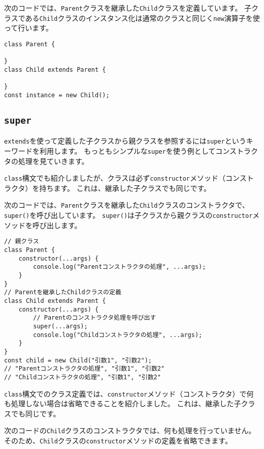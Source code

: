 次のコードでは、\texttt{Parent}クラスを継承した\texttt{Child}クラスを定義しています。
子クラスである\texttt{Child}クラスのインスタンス化は通常のクラスと同じく\texttt{new}演算子を使って行います。

\begin{lstlisting}
class Parent {

}
class Child extends Parent {

}
const instance = new Child();
\end{lstlisting}

\hypertarget{class-super}{%
\subsection{\texorpdfstring{\texttt{super}}{super}}\label{class-super}}

\texttt{extends}を使って定義した子クラスから親クラスを参照するには\texttt{super}というキーワードを利用します。
もっともシンプルな\texttt{super}を使う例としてコンストラクタの処理を見ていきます。

\texttt{class}構文でも紹介しましたが、クラスは必ず\texttt{constructor}メソッド（コンストラクタ）を持ちます。
これは、継承した子クラスでも同じです。

次のコードでは、\texttt{Parent}クラスを継承した\texttt{Child}クラスのコンストラクタで、\texttt{super()}を呼び出しています。
\texttt{super()}は子クラスから親クラスの\texttt{constructor}メソッドを呼び出します。

\begin{lstlisting}
// 親クラス
class Parent {
    constructor(...args) {
        console.log("Parentコンストラクタの処理", ...args);
    }
}
// Parentを継承したChildクラスの定義
class Child extends Parent {
    constructor(...args) {
        // Parentのコンストラクタ処理を呼び出す
        super(...args);
        console.log("Childコンストラクタの処理", ...args);
    }
}
const child = new Child("引数1", "引数2");
// "Parentコンストラクタの処理", "引数1", "引数2"
// "Childコンストラクタの処理", "引数1", "引数2"
\end{lstlisting}

\texttt{class}構文でのクラス定義では、\texttt{constructor}メソッド（コンストラクタ）で何も処理しない場合は省略できることを紹介しました。
これは、継承した子クラスでも同じです。

次のコードの\texttt{Child}クラスのコンストラクタでは、何も処理を行っていません。
そのため、\texttt{Child}クラスの\texttt{constructor}メソッドの定義を省略できます。

